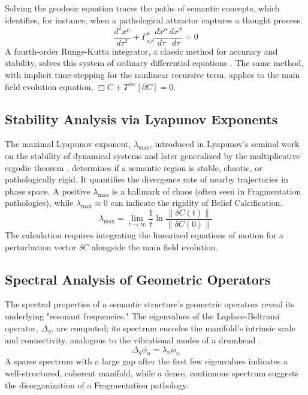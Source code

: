 Solving the geodesic equation traces the paths of semantic concepts, which identifies, for instance, when a pathological attractor captures a thought process.
\begin{equation}
\frac{d^2 x^{\mu}}{d\tau^2} + \Gamma^{\mu}_{\alpha\beta} \frac{dx^{\alpha}}{d\tau} \frac{dx^{\beta}}{d\tau} = 0
\end{equation}
A fourth-order Runge-Kutta integrator, a classic method for accuracy and stability, solves this system of ordinary differential equations \autocite{Runge1895, Kutta1901}. The same method, with implicit time-stepping for the nonlinear recursive term, applies to the main field evolution equation, \(\Box C + T^{\text{rec}}[\partial C] = 0\).

\subsection{Stability Analysis via Lyapunov Exponents}

The maximal Lyapunov exponent, \(\lambda_{\max}\), introduced in Lyapunov's seminal work on the stability of dynamical systems and later generalized by the multiplicative ergodic theorem \autocite{Lyapunov1907, Oseledets1968}, determines if a semantic region is stable, chaotic, or pathologically rigid. It quantifies the divergence rate of nearby trajectories in phase space. A positive \(\lambda_{\max}\) is a hallmark of chaos (often seen in Fragmentation pathologies), while \(\lambda_{\max} \approx 0\) can indicate the rigidity of Belief Calcification.
\begin{equation}
\lambda_{\max} = \lim_{t \to \infty} \frac{1}{t} \ln \frac{\|\delta C(t)\|}{\|\delta C(0)\|}
\end{equation}
The calculation requires integrating the linearized equations of motion for a perturbation vector \(\delta C\) alongside the main field evolution.

\subsection{Spectral Analysis of Geometric Operators}

The spectral properties of a semantic structure's geometric operators reveal its underlying "resonant frequencies." The eigenvalues of the Laplace-Beltrami operator, \(\Delta_g\), are computed; its spectrum encodes the manifold's intrinsic scale and connectivity, analogous to the vibrational modes of a drumhead \autocite{Chung1997}.
\begin{equation}
\Delta_g \phi_n = \lambda_n \phi_n
\end{equation}
A sparse spectrum with a large gap after the first few eigenvalues indicates a well-structured, coherent manifold, while a dense, continuous spectrum suggests the disorganization of a Fragmentation pathology.

